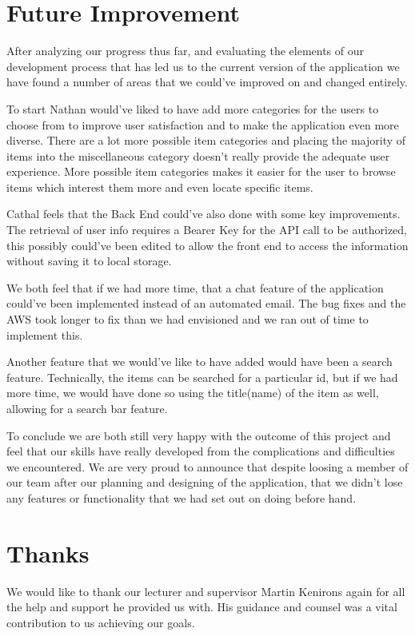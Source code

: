 \section{Future Improvement}
After analyzing our progress thus far, and evaluating the elements of our development process that has led us to the current version of the application we have found a number of areas that we could've improved on and changed entirely.\par
To start Nathan would've liked to have add more categories for the users to choose from to improve user satisfaction and to make the application even more diverse. There are a lot more possible item categories and placing the majority of items into the miscellaneous category doesn't really provide the adequate user experience. More possible item categories makes it easier for the user to browse items which interest them more and even locate specific items. \par
Cathal feels that the Back End could've also done with some key improvements. The retrieval of user info requires a Bearer Key for the API call to be authorized, this possibly could've been edited to allow the front end to access the information without saving it to local storage. \par
We both feel that if we had more time, that a chat feature of the application could've been implemented instead of an automated email. The bug fixes and the AWS took longer to fix than we had envisioned and we ran out of time to implement this. \par
Another feature that we would've like to have added would have been a search feature. Technically, the items can be searched for a particular id, but if we had more time, we would have done so using the title(name) of the item as well, allowing for a search bar feature. \par
To conclude we are both still very happy with the outcome of this project and feel that our skills have really developed from the complications and difficulties we encountered. We are very proud to announce that despite loosing a member of our team after our planning and designing of the application, that we didn't lose any features or functionality that we had set out on doing before hand.

\section{Thanks}
We would like to thank our lecturer and supervisor Martin Kenirons again for all the help and support he provided us with. His guidance and counsel was a vital contribution to us achieving our goals.
